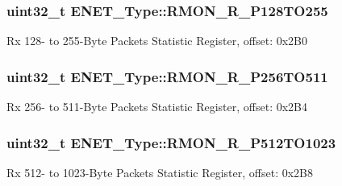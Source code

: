 \subsubsection[{\texorpdfstring{R\+M\+O\+N\+\_\+\+R\+\_\+\+P128\+T\+O255}{RMON_R_P128TO255}}]{ uint32\+\_\+t E\+N\+E\+T\+\_\+\+Type\+::\+R\+M\+O\+N\+\_\+\+R\+\_\+\+P128\+T\+O255}\hypertarget{structENET__Type_ab15081186bc033a90fb4e7504ffcdabf}{}\label{structENET__Type_ab15081186bc033a90fb4e7504ffcdabf}
Rx 128-\/ to 255-\/\+Byte Packets Statistic Register, offset\+: 0x2\+B0 
\subsubsection[{\texorpdfstring{R\+M\+O\+N\+\_\+\+R\+\_\+\+P256\+T\+O511}{RMON_R_P256TO511}}]{ uint32\+\_\+t E\+N\+E\+T\+\_\+\+Type\+::\+R\+M\+O\+N\+\_\+\+R\+\_\+\+P256\+T\+O511}\hypertarget{structENET__Type_ae75293961f394557a8b8e65268850ebf}{}\label{structENET__Type_ae75293961f394557a8b8e65268850ebf}
Rx 256-\/ to 511-\/\+Byte Packets Statistic Register, offset\+: 0x2\+B4 
\subsubsection[{\texorpdfstring{R\+M\+O\+N\+\_\+\+R\+\_\+\+P512\+T\+O1023}{RMON_R_P512TO1023}}]{ uint32\+\_\+t E\+N\+E\+T\+\_\+\+Type\+::\+R\+M\+O\+N\+\_\+\+R\+\_\+\+P512\+T\+O1023}\hypertarget{structENET__Type_aaf5deb1871d50cc48366589db309bd16}{}\label{structENET__Type_aaf5deb1871d50cc48366589db309bd16}
Rx 512-\/ to 1023-\/\+Byte Packets Statistic Register, offset\+: 0x2\+B8 
